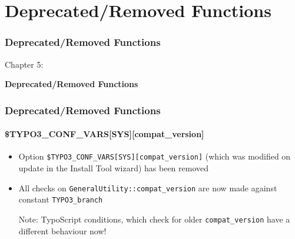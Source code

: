 %

\section{Deprecated/Removed Functions}
\begin{frame}[fragile]
	\frametitle{Deprecated/Removed Functions}

	\begin{center}\huge{Chapter 5:}\end{center}
	\begin{center}\huge{\color{typo3darkgrey}\textbf{Deprecated/Removed Functions}}\end{center}

\end{frame}


\begin{frame}[fragile]
	\frametitle{Deprecated/Removed Functions}
	\framesubtitle{\$TYPO3\_CONF\_VARS[SYS][compat\_version]}

	\begin{itemize}

		\item Option \texttt{\$TYPO3\_CONF\_VARS[SYS][compat\_version]} (which was modified on
			update in the Install Tool wizard) has been removed

		\item All checks on \texttt{GeneralUtility::compat\_version} are now made against
			constant \texttt{TYPO3\_branch}

			\vspace{0.2cm}

			\begingroup
				\color{red}
					Note: TypoScript conditions, which check for older \texttt{compat\_version}
					have a different behaviour now!
			\endgroup

	\end{itemize}

\end{frame}

